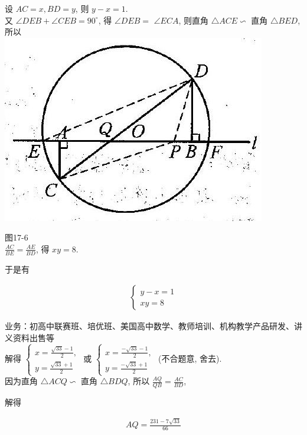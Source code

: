 \documentclass[10pt]{article}
\begin{document}
设 $A C=x, B D=y$, 则 $y-x=1$.\\
又 $\angle D E B+\angle C E B=90^{\circ}$, 得 $\angle D E B=$ $\angle E C A$, 则直角 $\triangle A C E \backsim$ 直角 $\triangle B E D$, 所以\\
\includegraphics[max width=\textwidth, center]{2024_10_30_26b590fd1106d28139f0g-119}

图17-6\\
$\frac{A C}{B E}=\frac{A E}{B D}$, 得 $x y=8$.

于是有

\begin{align*}
\left\{\begin{array}{l}
y-x=1 \\
x y=8
\end{array}\right.
\end{align*}

业务：初高中联赛班、培优班、美国高中数学、教师培训、机构教学产品研发、讲义资料出售等\\
解得 $\left\{\begin{array}{l}x=\frac{\sqrt{33}-1}{2}, \\ y=\frac{\sqrt{33}+1}{2}\end{array}\right.$ 或 $\left\{\begin{array}{l}x=\frac{-\sqrt{33}-1}{2}, \\ y=\frac{-\sqrt{33}+1}{2}\end{array}\right.$ (不合题意, 舍去).\\
因为直角 $\triangle A C Q \backsim$ 直角 $\triangle B D Q$, 所以 $\frac{A Q}{Q B}=\frac{A C}{B D}$,

解得

\begin{align*}
A Q=\frac{231-7 \sqrt{33}}{66}
\end{align*}
\end{document}

